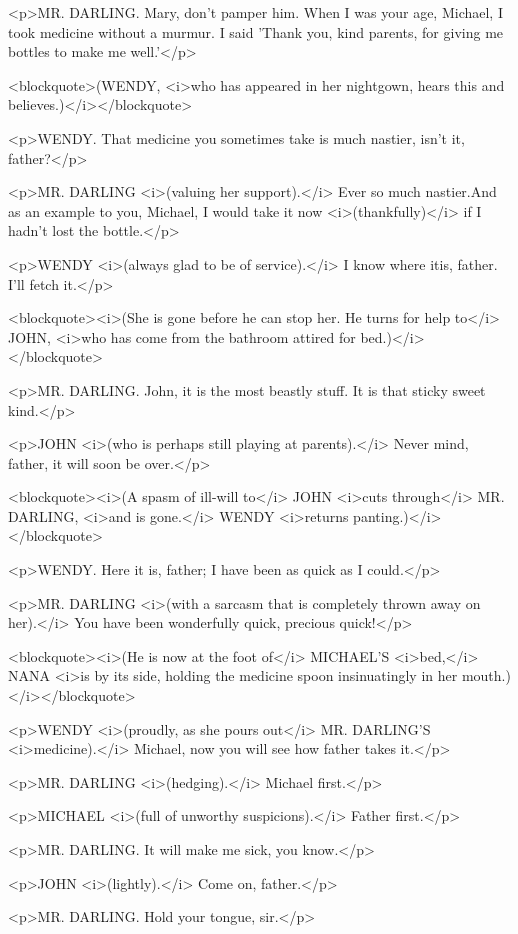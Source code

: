 <p>MR. DARLING. Mary, don't pamper him. When I was your age, Michael, I took medicine without a murmur. I said 'Thank you, kind parents, for giving me bottles to make me well.'</p>

<blockquote>(WENDY, <i>who has appeared in her nightgown, hears this and believes.)</i></blockquote>

<p>WENDY. That medicine you sometimes take is much nastier, isn't it, father?</p>

<p>MR. DARLING <i>(valuing her support).</i> Ever so much nastier.And as an example to you, Michael, I would take it now <i>(thankfully)</i> if I hadn't lost the bottle.</p>

<p>WENDY <i>(always glad to be of service).</i> I know where itis, father. I'll fetch it.</p>

<blockquote><i>(She is gone before he can stop her. He turns for help to</i> JOHN, <i>who has come from the bathroom attired for bed.)</i></blockquote>

<p>MR. DARLING. John, it is the most beastly stuff. It is that sticky sweet kind.</p>

<p>JOHN <i>(who is perhaps still playing at parents).</i> Never mind, father, it will soon be over.</p>

<blockquote><i>(A spasm of ill-will to</i> JOHN <i>cuts through</i> MR. DARLING, <i>and is gone.</i> WENDY <i>returns panting.)</i></blockquote>

<p>WENDY. Here it is, father; I have been as quick as I could.</p>

<p>MR. DARLING <i>(with a sarcasm that is completely thrown away on her).</i> You have been wonderfully quick, precious quick!</p>

<blockquote><i>(He is now at the foot of</i> MICHAEL'S <i>bed,</i> NANA <i>is by its side, holding the medicine spoon insinuatingly in her mouth.)</i></blockquote>

<p>WENDY <i>(proudly, as she pours out</i> MR. DARLING'S <i>medicine).</i> Michael, now you will see how father takes it.</p>

<p>MR. DARLING <i>(hedging).</i> Michael first.</p>

<p>MICHAEL <i>(full of unworthy suspicions).</i> Father first.</p>

<p>MR. DARLING. It will make me sick, you know.</p>

<p>JOHN <i>(lightly).</i> Come on, father.</p>

<p>MR. DARLING. Hold your tongue, sir.</p>

